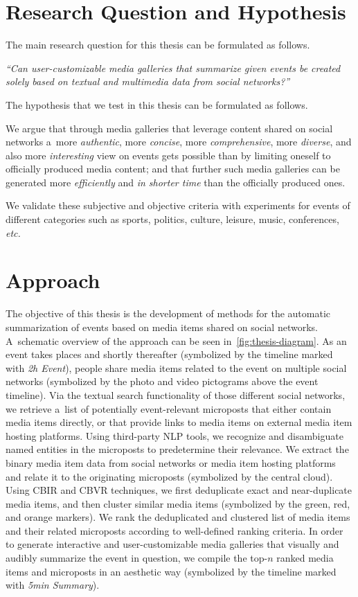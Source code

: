 \section{Research Question and Hypothesis}

The main research question for this thesis
can be formulated as follows.
 
\textit{``Can user-customizable
media galleries that summarize given events be
created solely based on textual and multimedia data
from social networks?''}

\noindent The hypothesis that we test in this thesis
can be formulated as follows.

We argue that
through media galleries that leverage content
shared on social networks
a~more \emph{authentic}, more \emph{concise},
more \emph{comprehensive}, more \emph{diverse},
and also more \emph{interesting}
view on events gets possible than by limiting oneself
to officially produced media content;
and that further such media galleries can be generated
more \emph{efficiently} and \emph{in shorter time}
than the officially produced ones.

We validate these subjective and objective
criteria with experiments for events of different categories
such as sports, politics, culture, leisure,
music, conferences, \emph{etc.}

\section{Approach}

The objective of this thesis is the development
of methods for the automatic summarization of events
based on media items shared on social networks.
A~schematic overview of the approach can be seen
in~\autoref{fig:thesis-diagram}.
As an event takes places and shortly thereafter
(symbolized by the timeline marked with \emph{2h Event}),
people share media items related to the event
on multiple social networks
(symbolized by the photo and video pictograms
above the event timeline).
Via the textual search functionality of those
different social networks,
we retrieve a~list of potentially event-relevant
microposts that either contain media items directly,
or that provide links to media items
on external media item hosting platforms.
Using third-party NLP tools,
we recognize and disambiguate named entities
in the microposts to predetermine their relevance.
We extract the binary media item data
from social networks or media item hosting platforms
and relate it to the originating microposts
(symbolized by the central cloud).
Using CBIR and CBVR techniques, we first deduplicate
exact and near-duplicate media items,
and then cluster similar media items
(symbolized by the green, red, and orange markers).
We rank the deduplicated and clustered list
of media items and their related microposts
according to well-defined ranking criteria.
In order to generate interactive and user-customizable
media galleries that visually and audibly summarize the
event in question, we compile the top-$n$ ranked
media items and microposts in an aesthetic way
(symbolized by the timeline marked with \emph{5min Summary}).

